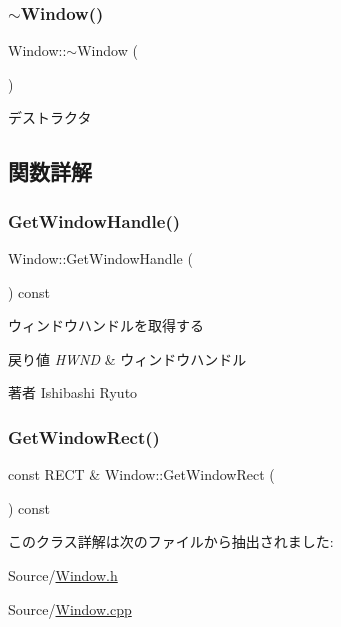\subsubsection{\texorpdfstring{$\sim$\+Window()}{~Window()}}
{\footnotesize\ttfamily Window\+::$\sim$\+Window (\begin{DoxyParamCaption}{ }\end{DoxyParamCaption})}



デストラクタ 



\subsection{関数詳解}
\mbox{\label{class_window_a89ecd827044f54fcc43720b3d6ca731b}} 
\subsubsection{\texorpdfstring{Get\+Window\+Handle()}{GetWindowHandle()}}
{\footnotesize\ttfamily Window\+::\+Get\+Window\+Handle (\begin{DoxyParamCaption}{ }\end{DoxyParamCaption}) const}

ウィンドウハンドルを取得する 
\begin{DoxyRetVals}{戻り値}
{\em H\+W\+ND} & ウィンドウハンドル \\
\hline
\end{DoxyRetVals}
\begin{DoxyAuthor}{著者}
Ishibashi Ryuto 
\end{DoxyAuthor}
\mbox{\label{class_window_a3b03632363eef6f6f7366debe4576f17}} 
\subsubsection{\texorpdfstring{Get\+Window\+Rect()}{GetWindowRect()}}
{\footnotesize\ttfamily const R\+E\+CT \& Window\+::\+Get\+Window\+Rect (\begin{DoxyParamCaption}{ }\end{DoxyParamCaption}) const}



このクラス詳解は次のファイルから抽出されました\+:\begin{DoxyCompactItemize}
\item 
Source/\mbox{\hyperlink{_window_8h}{Window.\+h}}\item 
Source/\mbox{\hyperlink{_window_8cpp}{Window.\+cpp}}\end{DoxyCompactItemize}
